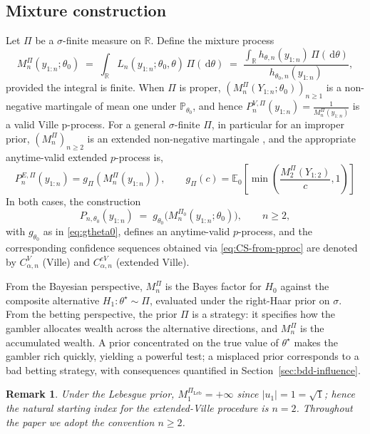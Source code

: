 \documentclass[numsec,webpdf,modern,medium,namedate]{oup-authoring-template}
\theoremstyle{thmstyleone}%
\theoremstyle{thmstyletwo}%
\newtheorem{remark}{Remark}%
\theoremstyle{thmstylethree}%
\newcommand{\E}{\mathbb{E}}
\newcommand{\Prob}{\mathbb{P}}
\newcommand{\dd}{\,\mathrm{d}}
\newcommand{\Leb}{\mathrm{Leb}}
\newcommand{\1}{\mathbf{1}}
\begin{document}
\subsection{Mixture construction}\label{ssec:mixture}

Let \(\Pi\) be a \(\sigma\)-finite measure on \(\mathbb{R}\). Define the mixture process
\begin{equation}\label{eq:Mn-def}
  M_n^{\Pi}(y_{1:n};\theta_0)
  \;=\;\int_\mathbb{R} L_n(y_{1:n};\theta_0,\theta)\,\Pi(\dd\theta)
  \;=\;\frac{\int_\mathbb{R} h_{\theta,n}(y_{1:n})\,\Pi(\dd\theta)}
            {h_{\theta_0,n}(y_{1:n})},
\end{equation}
provided the integral is finite. When \(\Pi\) is proper, \((M_n^{\Pi}(Y_{1:n};\theta_0))_{n\geq 1}\) is a non-negative martingale of mean one under \(\Prob_{\theta_0}\), and hence \(
P_n^{V,\Pi}(y_{1:n})=\frac{1}{M_n^\Pi(y_{1:n})} \)
is a valid Ville p-process. For a general $\sigma$-finite $\Pi$, in particular for an improper prior, $(M_n^\Pi)_{n\geq 2}$ is an extended non-negative martingale \citep{wang2025extended}, and the appropriate anytime-valid extended $p$-process is,
\[
P_n^{E,\Pi}(y_{1:n})=g_\Pi(M_n^\Pi(y_{1:n})),
\qquad
g_\Pi(c)=\E_{0}\!\left[\min\!\left(\frac{M_2^\Pi(Y_{1:2})}{c},1\right)\right]
\]
In both
cases, the construction
\begin{equation}\label{eq:p-from-M}
  P_{n,\theta_0}(y_{1:n})
  \;=\;
  g_{\theta_0}\!\bigl(M_n^{\Pi_0}(y_{1:n};\theta_0)\bigr),
  \qquad n\geq 2,
\end{equation}
with \(g_{\theta_0}\) as in \eqref{eq:gtheta0}, defines an anytime-valid $p$-process, and the corresponding confidence sequences obtained via \eqref{eq:CS-from-pproc} are denoted by \(C^V_{\alpha,n}\) (Ville) and \(C^{eV}_{\alpha,n}\) (extended Ville).

From the Bayesian perspective, \(M_n^{\Pi}\) is
the Bayes factor for \(H_0\) against the composite alternative \(H_1:\theta^\star\sim\Pi\), evaluated under the right-Haar prior on \(\sigma\). From the betting perspective, the prior \(\Pi\) is a strategy: it specifies how the gambler allocates wealth across the alternative directions, and \(M_n^{\Pi}\) is the accumulated wealth. A prior concentrated on the true value of \(\theta^\star\) makes the gambler rich quickly, yielding a powerful test; a misplaced prior corresponds to a bad betting strategy, with consequences quantified in Section~\ref{sec:bdd-influence}.
\begin{remark}\label{rem:start-n2}
Under the Lebesgue prior, \(M_1^{\Pi_{\Leb}}=+\infty\) since
\(|u_1|=1=\sqrt 1\); hence the natural starting index for the
extended-Ville procedure is \(n=2\). Throughout the paper we adopt
the convention \(n\geq 2\).
\end{remark}
\end{document}
